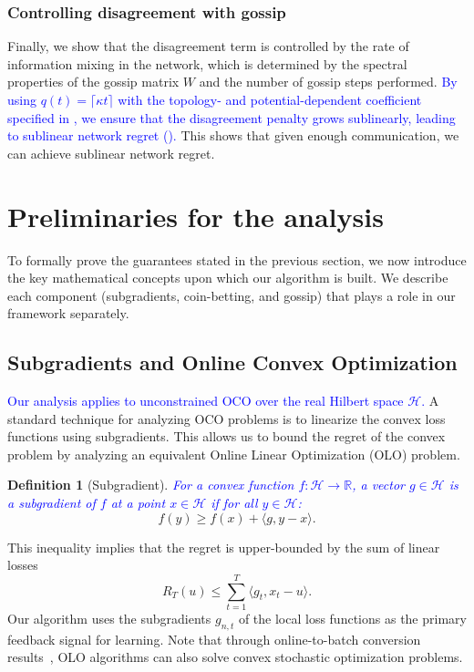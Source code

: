 \documentclass[journal]{IEEEtran}
\newtheorem{definition}{Definition}
\newcommand{\Hil}{\mathcal{H}} %
\begin{document}
\subsubsection{Controlling disagreement with gossip}
Finally, we show that the disagreement term is controlled by the rate of information mixing in the network, which is determined by the spectral properties of the gossip matrix $W$ and the number of gossip steps performed.
\textcolor{blue}{By using $q(t)=\lceil\kappa t\rceil$ with the topology- and potential-dependent coefficient specified in , we ensure that the disagreement penalty grows sublinearly, leading to sublinear network regret ().}
This shows that given enough communication, we can achieve sublinear network regret.

\section{Preliminaries for the analysis}\label{sec:preliminaries}
To formally prove the guarantees stated in the previous section, we now introduce the key mathematical concepts upon which our algorithm is built.
We describe each component (subgradients, coin-betting, and gossip) that plays a role in our framework separately.

\subsection{Subgradients and Online Convex Optimization}
\textcolor{blue}{Our analysis applies to unconstrained OCO over the real Hilbert space $\Hil$.}
A standard technique for analyzing OCO problems is to linearize the convex loss functions using subgradients.
This allows us to bound the regret of the convex problem by analyzing an equivalent Online Linear Optimization (OLO) problem.

\begin{definition}[Subgradient]
    \textcolor{blue}{For a convex function $f: \Hil\rightarrow \mathbb{R}$, a vector $g \in \Hil$ is a \emph{subgradient} of $f$ at a point $x \in \Hil$ if for all $y \in \Hil$:}
    \begin{equation*}
        f(y) \geq f(x) + \langle g, y - x \rangle.
    \end{equation*}
\end{definition}
This inequality implies that the regret is upper-bounded by the sum of linear losses
\begin{equation}
    R_{T}(u) \leq \sum_{t=1}^{T} \langle g_{t}, x_{t} - u \rangle.
\end{equation}
Our algorithm uses the subgradients $g_{n,t}$ of the local loss functions as the primary feedback signal for learning.
Note that through online-to-batch conversion results~\cite{cesa-bianchi_generalization_2004}, OLO algorithms can also solve convex stochastic optimization problems.
\end{document}
